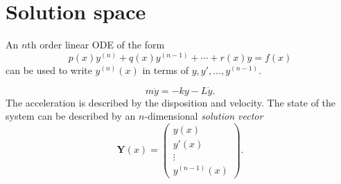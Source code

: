 \documentclass[10pt]{article}
\begin{document}
    \section{Solution space}
    An $n$th order linear ODE of the form
    \[p(x)y^{(n)}+q(x)y^{(n-1)}+\cdots+r(x)y=f(x)\]
    can be used to write $y^{(n)}(x)$ in terms of $ y,y',\dots, y^{(n-1)} $.
    \begin{example}
        \[m \ddot{y}=-ky-L \dot{y}.\]
        The acceleration is described by the disposition and velocity. The state of the system can be described by an $n$-dimensional \textit{solution vector}
        \begin{equation}\label{eq:12.3}
            \mathbf{Y}(x)=\begin{pmatrix}
                y(x)\\y'(x)\\\vdots\\y^{(n-1)}(x)
            \end{pmatrix}.
        \end{equation}
    \end{example}
\end{document}
